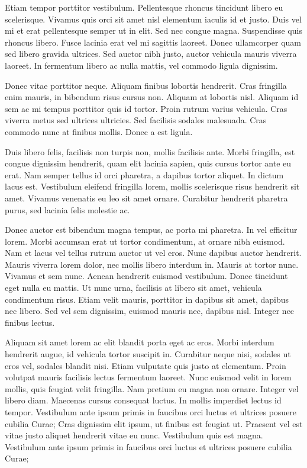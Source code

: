 Etiam tempor porttitor vestibulum. Pellentesque rhoncus tincidunt
libero eu scelerisque. Vivamus quis orci sit amet nisl elementum iaculis
id et justo. Duis vel mi et erat pellentesque semper ut in elit. Sed
nec congue magna. Suspendisse quis rhoncus libero. Fusce lacinia erat
vel mi sagittis laoreet. Donec ullamcorper quam sed libero gravida
ultrices. Sed auctor nibh justo, auctor vehicula mauris viverra laoreet.
In fermentum libero ac nulla mattis, vel commodo ligula dignissim.

Donec vitae porttitor neque. Aliquam finibus lobortis hendrerit. Cras
fringilla enim mauris, in bibendum risus cursus non. Aliquam at lobortis
nisl. Aliquam id sem ac mi tempus porttitor quis id tortor. Proin
rutrum varius vehicula. Cras viverra metus sed ultrices ultricies.
Sed facilisis sodales malesuada. Cras commodo nunc at finibus mollis.
Donec a est ligula.

Duis libero felis, facilisis non turpis non, mollis facilisis ante.
Morbi fringilla, est congue dignissim hendrerit, quam elit lacinia
sapien, quis cursus tortor ante eu erat. Nam semper tellus id orci
pharetra, a dapibus tortor aliquet. In dictum lacus est. Vestibulum
eleifend fringilla lorem, mollis scelerisque risus hendrerit sit amet.
Vivamus venenatis eu leo sit amet ornare. Curabitur hendrerit pharetra
purus, sed lacinia felis molestie ac.

Donec auctor est bibendum magna tempus, ac porta mi pharetra. In vel
efficitur lorem. Morbi accumsan erat ut tortor condimentum, at ornare
nibh euismod. Nam et lacus vel tellus rutrum auctor ut vel eros. Nunc
dapibus auctor hendrerit. Mauris viverra lorem dolor, nec mollis libero
interdum in. Mauris at tortor nunc. Vivamus et sem nunc. Aenean hendrerit
euismod vestibulum. Donec tincidunt eget nulla eu mattis. Ut nunc
urna, facilisis at libero sit amet, vehicula condimentum risus. Etiam
velit mauris, porttitor in dapibus sit amet, dapibus nec libero. Sed
vel sem dignissim, euismod mauris nec, dapibus nisl. Integer nec finibus
lectus.

Aliquam sit amet lorem ac elit blandit porta eget ac eros. Morbi interdum
hendrerit augue, id vehicula tortor suscipit in. Curabitur neque nisi,
sodales ut eros vel, sodales blandit nisi. Etiam vulputate quis justo
at elementum. Proin volutpat mauris facilisis lectus fermentum laoreet.
Nunc euismod velit in lorem mollis, quis feugiat velit fringilla.
Nam pretium eu magna non ornare. Integer vel libero diam. Maecenas
cursus consequat luctus. In mollis imperdiet lectus id tempor. Vestibulum
ante ipsum primis in faucibus orci luctus et ultrices posuere cubilia
Curae; Cras dignissim elit ipsum, ut finibus est feugiat ut. Praesent
vel est vitae justo aliquet hendrerit vitae eu nunc. Vestibulum quis
est magna. Vestibulum ante ipsum primis in faucibus orci luctus et
ultrices posuere cubilia Curae;

